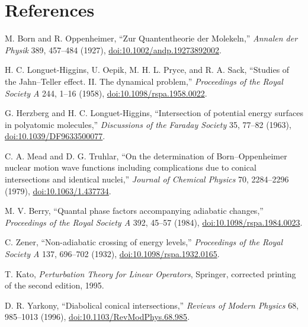 \documentclass[11pt,a4paper]{article}
\theoremstyle{definition}
\theoremstyle{plain}
\theoremstyle{remark}
\begin{document}
\begin{center}
\end{center}

\section*{References}
\begingroup
\raggedright
\begin{enumerate}[label={[\arabic*]},leftmargin=*,itemsep=3pt]
\item M. Born and R. Oppenheimer, ``Zur Quantentheorie der Molekeln,''
\emph{Annalen der Physik} 389, 457--484 (1927),
\href{https://doi.org/10.1002/andp.19273892002}{doi:10.1002/andp.19273892002}.
\item H. C. Longuet-Higgins, U. Oepik, M. H. L. Pryce, and
R. A. Sack, ``Studies of the Jahn--Teller effect. II. The dynamical
problem,'' \emph{Proceedings of the Royal Society A} 244, 1--16
(1958),
\href{https://doi.org/10.1098/rspa.1958.0022}{doi:10.1098/rspa.1958.0022}.
\item G. Herzberg and H. C. Longuet-Higgins, ``Intersection of
potential energy surfaces in polyatomic molecules,''
\emph{Discussions of the Faraday Society} 35, 77--82 (1963),
\href{https://doi.org/10.1039/DF9633500077}{doi:10.1039/DF9633500077}.
\item C. A. Mead and D. G. Truhlar, ``On the determination of
Born--Oppenheimer nuclear motion wave functions including
complications due to conical intersections and identical nuclei,''
\emph{Journal of Chemical Physics} 70, 2284--2296 (1979),
\href{https://doi.org/10.1063/1.437734}{doi:10.1063/1.437734}.
\item M. V. Berry, ``Quantal phase factors accompanying adiabatic
changes,'' \emph{Proceedings of the Royal Society A} 392, 45--57
(1984),
\href{https://doi.org/10.1098/rspa.1984.0023}{doi:10.1098/rspa.1984.0023}.
\item C. Zener, ``Non-adiabatic crossing of energy levels,''
\emph{Proceedings of the Royal Society A} 137, 696--702 (1932),
\href{https://doi.org/10.1098/rspa.1932.0165}{doi:10.1098/rspa.1932.0165}.
\item T. Kato, \emph{Perturbation Theory for Linear Operators},
Springer, corrected printing of the second edition, 1995.
\item D. R. Yarkony, ``Diabolical conical intersections,''
\emph{Reviews of Modern Physics} 68, 985--1013 (1996),
\href{https://doi.org/10.1103/RevModPhys.68.985}{doi:10.1103/RevModPhys.68.985}.
\end{enumerate}
\endgroup
\end{document}
